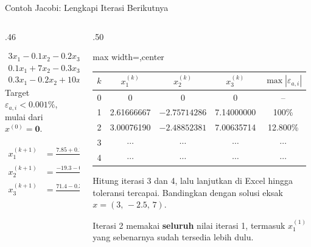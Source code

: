 \documentclass[aspectratio=169,10pt]{beamer}
\begin{document}
\begin{frame}{Contoh Jacobi: Lengkapi Iterasi Berikutnya}
\tiny
\begin{columns}[T,totalwidth=\textwidth]
\begin{column}{.46\textwidth}
\begin{bluebox}[Sistem]
\[
\begin{aligned}
3x_1-0.1x_2-0.2x_3&=7.85\\
0.1x_1+7x_2-0.3x_3&=-19.3\\
0.3x_1-0.2x_2+10x_3&=71.4
\end{aligned}
\]
Target $\varepsilon_{a,i}<0.001\%$, mulai dari $x^{(0)}=\mathbf{0}$.
\end{bluebox}
\begin{orangebox}
\[
\begin{aligned}
x_1^{(k+1)}&=\tfrac{7.85+0.1x_2^{(k)}+0.2x_3^{(k)}}{3}\\[1mm]
x_2^{(k+1)}&=\tfrac{-19.3-0.1x_1^{(k)}+0.3x_3^{(k)}}{7}\\[1mm]
x_3^{(k+1)}&=\tfrac{71.4-0.3x_1^{(k)}+0.2x_2^{(k)}}{10}
\end{aligned}
\]
\end{orangebox}
\end{column}
\begin{column}{.50\textwidth}
\renewcommand{\arraystretch}{1.16}
\begin{adjustbox}{max width=\linewidth,center}
\begin{tabular}{c c c c c}
\toprule
$k$ & $x_1^{(k)}$ & $x_2^{(k)}$ & $x_3^{(k)}$ & $\max|\varepsilon_{a,i}|$\\
\midrule
0 & 0 & 0 & 0 & --\\
1 & 2.61666667 & $-2.75714286$ & 7.14000000 & 100\%\\
2 & 3.00076190 & $-2.48852381$ & 7.00635714 & 12.800\%\\
3 & $\cdots$ & $\cdots$ & $\cdots$ & $\cdots$\\
4 & $\cdots$ & $\cdots$ & $\cdots$ & $\cdots$\\
\bottomrule
\end{tabular}
\end{adjustbox}
\vspace{1mm}
\begin{greenbox}
Hitung iterasi 3 dan 4, lalu lanjutkan di Excel hingga toleransi tercapai. Bandingkan dengan solusi eksak $x=(3,\,-2.5,\,7)$.
\end{greenbox}
\begin{goldbox}[Perhatikan]
Iterasi 2 memakai \textbf{seluruh} nilai iterasi 1, termasuk $x_1^{(1)}$ yang sebenarnya sudah tersedia lebih dulu.
\end{goldbox}
\end{column}
\end{columns}
\end{frame}
\end{document}
